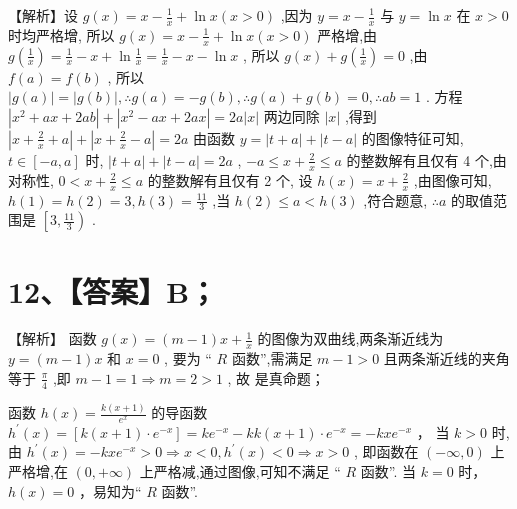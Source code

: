 \documentclass[10pt]{article}
\newcommand*\circled[1]{\tikz[baseline=(char.base)]{\node[shape=circle,draw,inner sep=1.5pt] (char) {\small #1};}}
\begin{document}
【解析】设 \(g\left( x\right)  = x - \frac{1}{x} + \ln x\left( {x > 0}\right)\) ,因为 \(y = x - \frac{1}{x}\) 与 \(y = \ln x\) 在 \(x > 0\) 时均严格增, 所以 \(g\left( x\right)  = x - \frac{1}{x} + \ln x\left( {x > 0}\right)\) 严格增,由 \(g\left( \frac{1}{x}\right)  = \frac{1}{x} - x + \ln \frac{1}{x} = \frac{1}{x} - x - \ln x\) , 所以 \(g\left( x\right)  + g\left( \frac{1}{x}\right)  = 0\) ,由 \(f\left( a\right)  = f\left( b\right)\) , 所以 \(\left| {g\left( a\right) }\right|  = \left| {g\left( b\right) }\right| ,\therefore g\left( a\right)  =  - g\left( b\right) ,\therefore g\left( a\right)  + g\left( b\right)  = 0,\therefore {ab} = 1\) . 方程 \(\left| {{x}^{2} + {ax} + {2ab}}\right|  + \left| {{x}^{2} - {ax} + {2ax}}\right|  = {2a}\left| x\right|\) 两边同除 \(\left| x\right|\) ,得到 \(\left| {x + \frac{2}{x} + a}\right|  + \left| {x + \frac{2}{x} - a}\right|  = {2a}\) 由函数 \(y = \left| {t + a}\right|  + \left| {t - a}\right|\) 的图像特征可知, \(t \in  \left\lbrack  {-a,a}\right\rbrack\) 时, \(\left| {t + a}\right|  + \left| {t - a}\right|  = {2a}\) , \(- a \leq  x + \frac{2}{x} \leq  a\) 的整数解有且仅有 4 个,由对称性, \(0 < x + \frac{2}{x} \leq  a\) 的整数解有且仅有 2 个, 设 \(h\left( x\right)  = x + \frac{2}{x}\) ,由图像可知, \(h\left( 1\right)  = h\left( 2\right)  = 3,h\left( 3\right)  = \frac{11}{3}\) ,当 \(h\left( 2\right)  \leq  a < h\left( 3\right)\) ,符合题意, \(\therefore a\) 的取值范围是 \(\left\lbrack  {3,\frac{11}{3}}\right)\) .

\section*{12、【答案】B；}

【解析】 \circled{1}  函数 \(g\left( x\right)  = \left( {m - 1}\right) x + \frac{1}{x}\) 的图像为双曲线,两条渐近线为 \(y = \left( {m - 1}\right) x\) 和 \(x = 0\) , 要为 “ \(R\) 函数”,需满足 \(m - 1 > 0\) 且两条渐近线的夹角等于 \(\frac{\pi }{4}\) ,即 \(m - 1 = 1 \Rightarrow  m = 2 > 1\) , 故 \circled{1} 是真命题；

 \circled{2}  函数 \(h\left( x\right)  = \frac{k\left( {x + 1}\right) }{{e}^{x}}\) 的导函数 \({h}^{\prime }\left( x\right)  = \left\lbrack  {k\left( {x + 1}\right)  \cdot  {e}^{-x}}\right\rbrack   = k{e}^{-x} - {kk}\left( {x + 1}\right)  \cdot  {e}^{-x} =  - {kx}{e}^{-x}\) ， 当 \(k > 0\) 时,由 \({h}^{\prime }\left( x\right)  =  - {kx}{e}^{-x} > 0 \Rightarrow  x < 0,{h}^{\prime }\left( x\right)  < 0 \Rightarrow  x > 0\) , 即函数在 \(\left( {-\infty ,0}\right)\) 上严格增,在 \(\left( {0, + \infty }\right)\) 上严格减,通过图像,可知不满足 “ \(R\) 函数”. 当 \(k = 0\) 时， \(h\left( x\right)  = 0\) ，易知为“ \(R\) 函数”.
\end{document}
